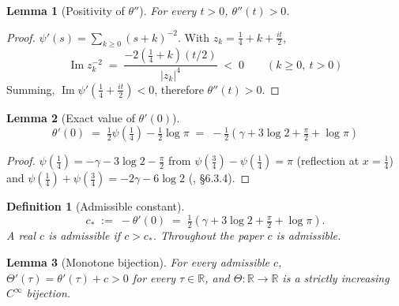\documentclass[11pt]{article}
\newtheorem{lemma}{Lemma}
\newtheorem{definition}{Definition}
\DeclareMathOperator{\ImOp}{Im}
\let\Im\ImOp
\begin{document}
\begin{lemma}[Positivity of $\theta''$]\label{lem:thetapp}
For every $t>0$, $\theta''(t)>0$.
\end{lemma}

\begin{proof}
$\psi'(s)=\sum_{k\ge 0}(s+k)^{-2}$. With $z_k=\tfrac{1}{4}+k+\tfrac{it}{2}$,
\begin{equation}\label{eq:Imzk2}
\Im z_k^{-2} \;=\; \frac{-2(\tfrac{1}{4}+k)(t/2)}{|z_k|^4} \;<\; 0 \qquad (k\ge 0,\ t>0)
\end{equation}
Summing, $\Im\psi'(\tfrac{1}{4}+\tfrac{it}{2})<0$, therefore $\theta''(t)>0$.
\end{proof}

\begin{lemma}[Exact value of $\theta'(0)$]\label{lem:thetaprime0}
\begin{equation}\label{eq:thetaprime0}
\theta'(0) \;=\; \tfrac{1}{2}\psi(\tfrac{1}{4}) - \tfrac{1}{2}\log\pi \;=\; -\tfrac{1}{2}\!\left(\gamma + 3\log 2 + \tfrac{\pi}{2} + \log\pi\right)
\end{equation}
\end{lemma}

\begin{proof}
$\psi(\tfrac{1}{4})=-\gamma-3\log 2-\tfrac{\pi}{2}$ from $\psi(\tfrac{3}{4})-\psi(\tfrac{1}{4})=\pi$ (reflection at $x=\tfrac{1}{4}$) and $\psi(\tfrac{1}{4})+\psi(\tfrac{3}{4})=-2\gamma-6\log 2$ (\cite{AbramowitzStegun}, \S6.3.4).
\end{proof}

\begin{definition}[Admissible constant]\label{def:cstar}
\begin{equation}\label{eq:cstar}
c_* \;:=\; -\theta'(0) \;=\; \tfrac{1}{2}(\gamma+3\log 2+\tfrac{\pi}{2}+\log\pi).
\end{equation}
A real $c$ is \emph{admissible} if $c>c_*$. Throughout the paper $c$ is admissible.
\end{definition}

\begin{lemma}[Monotone bijection]\label{lem:Thetabij}
For every admissible $c$, $\Theta'(\tau)=\theta'(\tau)+c>0$ for every $\tau\in\mathbb{R}$, and $\Theta:\mathbb{R}\to\mathbb{R}$ is a strictly increasing $C^\infty$ bijection.
\end{lemma}
\end{document}
